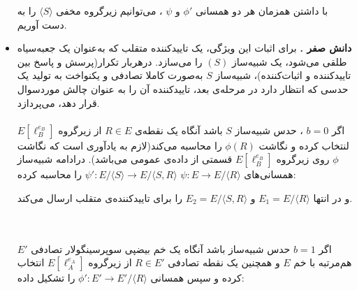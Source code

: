 \begin{itemize}
{\begin{figure}[H]
\begin{center}
		\caption{}
		\label{fig:soundness_security}
		
	\end{center}
\end{figure}


\begin{corollary}\label{corol: sound}
	با داشتن همزمان هر دو همسانی
	${\phi}'$
	و
	$\psi$
	، می‌توانیم زیرگروه مخفی
	$\langle S \rangle $
	را به دست آوریم.
\end{corollary}

}

\item [] {
\textbf{دانش صفر .}
برای اثبات این ویژگی، یک تاییدکننده متقلب
که به‌عنوان یک جعبه‌سیاه طلقی می‌شود، یک شبیه‌ساز
$(S)$
را می‌سازد. درهربار تکرار(پرسش و پاسخ بین تاییدکننده و اثبات‌کننده)، شبیه‌ساز
$S$
به‌صورت کاملا تصادفی و یکنواخت به تولید یک حدسی که انتظار دارد در مرحله‌ی بعد، تاییدکننده آن را به عنوان چالش موردسوال قرار دهد، می‌پردازد.
\\
\\
اگر 
$b=0$
، حدس شبیه‌ساز 
$S$
باشد آنگاه یک نقطه‌ی
$R \in E $
از زیرگروه 
$ E [ \ell_B^{e_B} ] $
لنتخاب کرده و نگاشت
$ \phi(R) $
را محاسبه می‌کند(لازم به یادآوری است که نگاشت 
$\phi$
روی زیرگروه
$ E [ \ell_B^{e_B} ] $
قسمتی از داده‌ی عمومی می‌باشد). درادامه شبیه‌ساز همسانی‌های
$ \psi : E \rightarrow E / \langle R \rangle  $
$ {\psi}' : E / \langle S \rangle \rightarrow E / \langle S,R \rangle $
را محاسبه کرده: 
\begin{figure}[H] 
	\begin{center}
		
		
		\caption{}
		\label{fig:zkp_security_b0}
		
	\end{center}
\end{figure}
 و در انتها
$E_1 = E / \langle R \rangle $
و
$E_2 = E / \langle S,R \rangle $
را برای تاییدکننده‌ی متقلب ارسال می‌کند.
}
\\
\\
اگر
$b=1$
حدس شبیه‌ساز باشد آنگاه یک خم بیضپی سوپرسینگولار تصادفی
$E'$
هم‌مرتبه با خم
$E$
و همچنین یک نقطه تصادفی
$R \in E'$
از زیرگروه
$E[\ell_A^{e_A}]$
انتخاب کرده و سپس همسانی
${\phi}' : E' \rightarrow E' / \langle R \rangle $
را تشکیل داده:
\begin{figure}[H] 
	\begin{center}
		

\end{center}
\end{figure}
\end{itemize}
